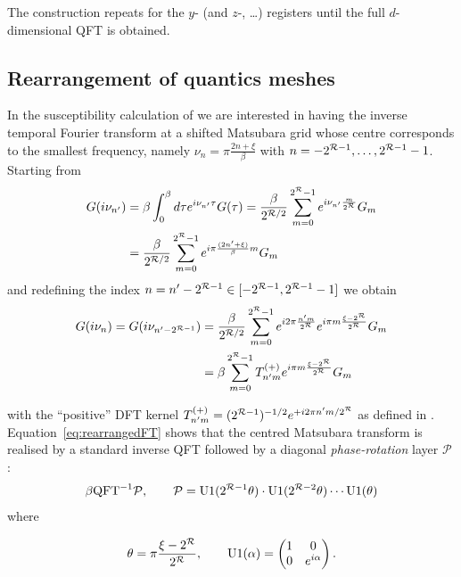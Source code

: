 The construction repeats for the \(y\)- (and \(z\)-, \dots) registers until the full \(d\)-dimensional QFT is obtained. 

\subsection{Rearrangement of quantics meshes}

In the susceptibility calculation of  we are interested in having the inverse temporal Fourier transform at a shifted Matsubara grid whose centre corresponds to the smallest frequency, namely $\nu_n = \pi\frac{2n + \xi}{\beta}$ with $n= -2^{\mathcal{R}-1},\dots,2^{\mathcal{R}-1}-1$. Starting from
\begin{equation}
\begin{aligned}
    G(i\nu_{n'}) &= \beta \int_{0}^{\beta} d\tau  e^{i\nu_{n'}\tau}  G(\tau) = \frac{\beta}{2^{\mathcal{R}/2}} \sum_{m=0}^{2^{\mathcal{R}}-1} e^{i\nu_{n'} \frac{m}{2^{\mathcal{R}}}} G_m \\
    &=\frac{\beta}{2^{\mathcal{R}/2}} \sum_{m=0}^{2^{\mathcal{R}}-1} e^{i\pi \frac{(2{n'} + \xi)}{\beta} m}  G_m
\end{aligned}
\end{equation}
and redefining the index \(n=n'-2^{\mathcal{R}-1}\in[-2^{\mathcal{R}-1},2^{\mathcal{R}-1}-1]\) we
obtain 
\begin{equation}
    \begin{aligned}   
    G(i\nu_{n}) = G(i\nu_{n' - 2^{\mathcal{R}-1}}) &= \frac{\beta}{2^{\mathcal{R}/2}} \sum_{m=0}^{2^{\mathcal{R}}-1} e^{i2\pi\frac{n'm}{2^{\mathcal{R}}}} e^{i\pi m \frac{\xi - 2^{\mathcal{R}}}{2^{\mathcal{R}}}} G_m \\
    &= \beta \sum_{m=0}^{2^{\mathcal{R}}-1} T^{(+)}_{n'm} e^{i\pi m \frac{\xi - 2^{\mathcal{R}}}{2^{\mathcal{R}}}} G_m
       \end{aligned}
    \label{eq:rearrangedFT}
\end{equation}

with the ``positive'' DFT kernel
\(T^{(+)}_{n'm}=(2^{\mathcal{R}-1})^{-1/2}e^{+i2\pi n'm/2^{\mathcal{R}}}\) as defined in .  
Equation~\eqref{eq:rearrangedFT} shows that the centred Matsubara transform is realised by a standard inverse QFT followed by a diagonal
\emph{phase-rotation} layer \(\mathcal P\) \cite{Hiroshi2023}: 
\begin{equation}
    \beta \text{QFT}^{-1}\mathcal{P}, \qquad 
    \mathcal{P} = \text{U}1(2^{\mathcal{R}-1}\theta)\cdot\text{U}1(2^{\mathcal{R}-2}\theta)\cdots\text{U}1(\theta)
\end{equation}
where

\begin{equation}
    \theta=\pi\frac{\xi-2^{\mathcal{R}}}{2^{\mathcal{R}}}, \qquad
    \text{U}1(\alpha) = \begin{pmatrix}
        1 & 0 \\
        0 & e^{i\alpha}
    \end{pmatrix}.
\end{equation}

